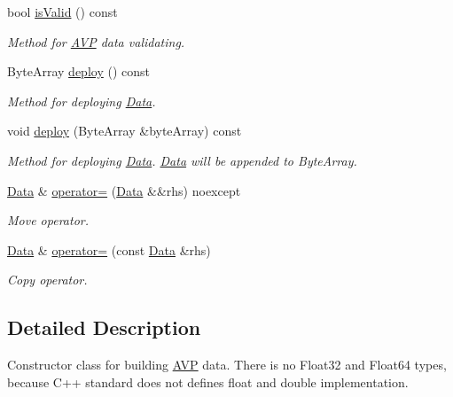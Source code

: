 \begin{DoxyCompactItemize}
bool \hyperlink{classDiameter_1_1AVP_1_1Data_adf7dd6eb3736b2d0269f57774758480e}{is\+Valid} () const
\begin{DoxyCompactList}\small\item\em Method for \hyperlink{classDiameter_1_1AVP}{A\+VP} data validating. \end{DoxyCompactList}\item 
Byte\+Array \hyperlink{classDiameter_1_1AVP_1_1Data_a71951bfda9c3be98f5c7c0e6fa5382cf}{deploy} () const
\begin{DoxyCompactList}\small\item\em Method for deploying \hyperlink{classDiameter_1_1AVP_1_1Data}{Data}. \end{DoxyCompactList}\item 
void \hyperlink{classDiameter_1_1AVP_1_1Data_a3c6e4d52e46b76b84fd8b9041638cc7f}{deploy} (Byte\+Array \&byte\+Array) const
\begin{DoxyCompactList}\small\item\em Method for deploying \hyperlink{classDiameter_1_1AVP_1_1Data}{Data}. \hyperlink{classDiameter_1_1AVP_1_1Data}{Data} will be appended to Byte\+Array. \end{DoxyCompactList}\item 
\hyperlink{classDiameter_1_1AVP_1_1Data}{Data} \& \hyperlink{classDiameter_1_1AVP_1_1Data_ae22c091934eb984ae9f0a03117ac7bf5}{operator=} (\hyperlink{classDiameter_1_1AVP_1_1Data}{Data} \&\&rhs) noexcept
\begin{DoxyCompactList}\small\item\em Move operator. \end{DoxyCompactList}\item 
\hyperlink{classDiameter_1_1AVP_1_1Data}{Data} \& \hyperlink{classDiameter_1_1AVP_1_1Data_afa01df00dd5cfda793ed683c8c999a86}{operator=} (const \hyperlink{classDiameter_1_1AVP_1_1Data}{Data} \&rhs)
\begin{DoxyCompactList}\small\item\em Copy operator. \end{DoxyCompactList}\end{DoxyCompactItemize}


\subsection{Detailed Description}
Constructor class for building \hyperlink{classDiameter_1_1AVP}{A\+VP} data. There is no Float32 and Float64 types, because C++ standard does not defines {\ttfamily float} and {\ttfamily double} implementation. 

